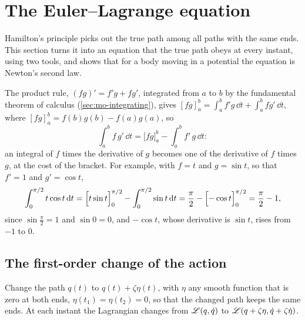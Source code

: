 \section{The Euler--Lagrange equation}
\label{sec:la-euler}

Hamilton's principle picks out the true path among all paths with the
same ends. This section turns it into an equation that the true path
obeys at every instant, using two tools, and shows that for a body moving
in a potential the equation is Newton's second law.

\begin{toolbox}
The product rule, $(fg)' = f'g + fg'$, integrated from $a$ to $b$ by the
fundamental theorem of calculus (\cref{sec:mo-integrating}), gives
$[fg]_a^b = \int_a^b f'g\,\dd t + \int_a^b fg'\,\dd t$, where $[fg]_a^b =
f(b)g(b) - f(a)g(a)$, so
\begin{equation*}
   \int_a^b f\,g'\,\dd t = \bigl[fg\bigr]_a^b - \int_a^b f'\,g\,\dd t :
\end{equation*}
an integral of $f$ times the derivative of $g$ becomes one of the
derivative of $f$ times $g$, at the cost of the bracket. For example,
with $f = t$ and $g = \sin t$, so that $f' = 1$ and $g' = \cos t$,
\begin{equation*}
   \int_0^{\pi/2} t\cos t\,\mathrm{d} t = \Bigl[t\sin t\Bigr]_0^{\pi/2}
   - \int_0^{\pi/2}\sin t\,\mathrm{d} t = \frac{\pi}{2} - \Bigl[-\cos t
   \Bigr]_0^{\pi/2} = \frac{\pi}{2} - 1 ,
\end{equation*}
since $\sin\frac{\pi}{2} = 1$ and $\sin 0 = 0$, and $-\cos t$, whose
derivative is $\sin t$, rises from $-1$ to 0.
\end{toolbox}

\subsection*{The first-order change of the action}

Change the path $q(t)$ to $q(t) + \zeta\eta(t)$, with $\eta$ any smooth
function that is zero at both ends, $\eta(t_1) = \eta(t_2) = 0$, so that
the changed path keeps the same ends. At each instant the Lagrangian
changes from $\mathscr{L}(q, \dot{q})$ to $\mathscr{L}(q + \zeta\eta, \dot{q} +
\zeta\dot\eta)$.


